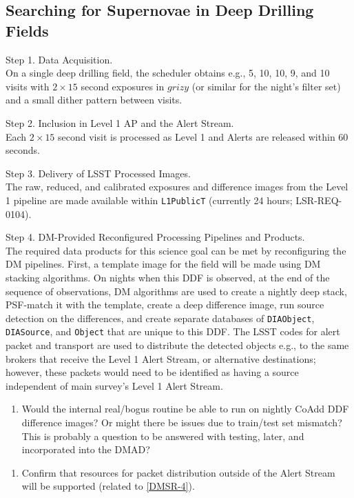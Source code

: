 \documentclass[DM,lsstdraft,toc]{lsstdoc}
\begin{document}
\subsection{Searching for Supernovae in Deep Drilling Fields}\label{ssec:SPCS_SNDDF}

Step 1. Data Acquisition. \\ 
On a single deep drilling field, the scheduler obtains e.g., 5, 10, 10, 9, and 10 visits with $2\times15$ second exposures in $grizy$ (or similar for the night's filter set) and a small dither pattern between visits.

Step 2. Inclusion in Level 1 AP and the Alert Stream. \\ 
Each $2\times15$ second visit is processed as Level 1 and Alerts are released within 60 seconds.

Step 3. Delivery of LSST Processed Images. \\ 
The raw, reduced, and calibrated exposures and difference images from the Level 1 pipeline are made available within {\tt L1PublicT} (currently 24 hours; LSR-REQ-0104).

Step 4. DM-Provided Reconfigured Processing Pipelines and Products. \\ 
The required data products for this science goal can be met by reconfiguring the DM pipelines. First, a template image for the field will be made using DM stacking algorithms. On nights when this DDF is observed, at the end of the sequence of observations, DM algorithms are used to create a nightly deep stack, PSF-match it with the template, create a deep difference image, run source detection on the differences, and create separate databases of {\tt DIAObject}, {\tt DIASource}, and {\tt Object} that are unique to this DDF. The LSST codes for alert packet and transport are used to distribute the detected objects e.g., to the same brokers that receive the Level 1 Alert Stream, or alternative destinations; however, these packets would need to be identified as having a source independent of main survey's Level 1 Alert Stream.
\begin{enumerate}[resume,topsep=-10pt,label= \textbf{Concern \Roman*.}] \item \label{SPCS-1} Would the internal real/bogus routine be able to run on nightly CoAdd DDF difference images? Or might there be issues due to train/test set mismatch? This is probably a question to be answered with testing, later, and incorporated into the DMAD? \end{enumerate}
\begin{enumerate}[resume,topsep=-10pt,label= \textbf{Concern \Roman*.}] \item \label{SPCS-2} Confirm that resources for packet distribution outside of the Alert Stream will be supported (related to \ref{DMSR-4}). \end{enumerate}
\end{document}
